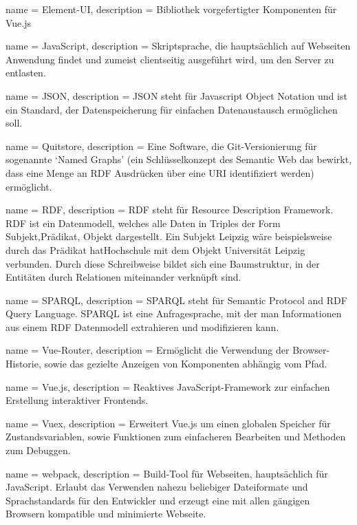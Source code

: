  {
    name = Element-UI,
    description = {
        Bibliothek vorgefertigter Komponenten für Vue.js
    }
}

 {
    name = JavaScript,
    description = {
        Skriptsprache, die hauptsächlich auf Webseiten Anwendung findet und zumeist clientseitig ausgeführt wird, um den Server zu entlasten.
    }
}

 {
    name = JSON,
    description = {
        JSON steht für Javascript Object Notation und ist ein Standard, der Datenspeicherung für einfachen Datenaustausch ermöglichen soll.
    }
}

 {
    name = Quitstore,
    description = {
        Eine Software, die Git-Versionierung für sogenannte `Named Graphs' (ein Schlüsselkonzept des Semantic Web das bewirkt, dass eine Menge an RDF Ausdrücken über eine URI identifiziert werden) ermöglicht.
    }
}

 {
    name = RDF,
    description = {
        RDF steht für Resource Description Framework. RDF ist ein Datenmodell, welches alle Daten in Triples der Form Subjekt,Prädikat, Objekt dargestellt. Ein Subjekt Leipzig wäre beispielsweise durch das Prädikat hatHochschule mit dem Objekt Universität Leipzig verbunden. Durch diese Schreibweise bildet sich eine Baumstruktur, in der Entitäten durch Relationen miteinander verknüpft sind.
    }
}

 {
    name = SPARQL,
    description = {
        SPARQL steht für Semantic Protocol and RDF Query Language. SPARQL ist eine Anfragesprache, mit der man Informationen aus einem RDF Datenmodell extrahieren und modifizieren kann.
    }
}

 {
    name = Vue-Router,
    description = {
        Ermöglicht die Verwendung der Browser-Historie, sowie das gezielte Anzeigen von Komponenten abhängig vom Pfad.
    }
}

 {
    name = Vue.js,
    description = {
        Reaktives JavaScript-Framework zur einfachen Erstellung interaktiver Frontends.
    }
}

 {
    name = Vuex,
    description = {
        Erweitert Vue.js um einen globalen Speicher für Zustandsvariablen, sowie Funktionen zum einfacheren Bearbeiten und Methoden zum Debuggen.
    }
}

 {
    name = webpack,
    description = {
        Build-Tool für Webseiten, hauptsächlich für JavaScript. Erlaubt das Verwenden nahezu beliebiger Dateiformate und Sprachstandards für den Entwickler und erzeugt eine mit allen gängigen Browsern kompatible und minimierte Webseite.
    }
}
